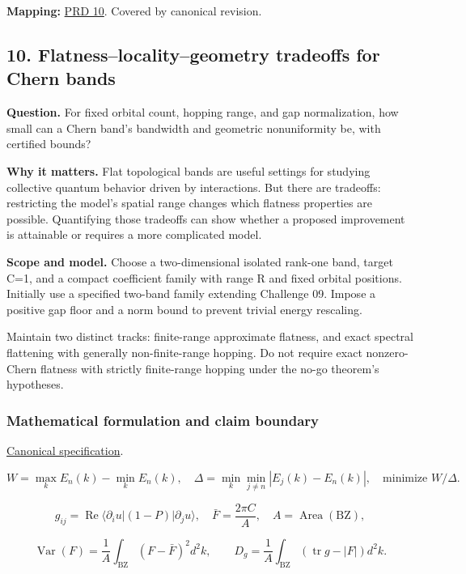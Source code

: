 \documentclass[
  11pt,
]{article}
\begin{document}
\textbf{Mapping:}
\href{https://github.com/rick-stevens-ai/Pure-Thought/blob/main/PRDs/10-Flat-Chern-Bands.md}{PRD
10}. Covered by canonical revision.

\subsection{10. Flatness--locality--geometry tradeoffs for Chern bands}

\textbf{Question.} For fixed orbital count, hopping range, and gap
normalization, how small can a Chern band's bandwidth and geometric
nonuniformity be, with certified bounds?

\textbf{Why it matters.} Flat topological bands are useful settings for
studying collective quantum behavior driven by interactions. But there
are tradeoffs: restricting the model's spatial range changes which
flatness properties are possible. Quantifying those tradeoffs can show
whether a proposed improvement is attainable or requires a more
complicated model.

\textbf{Scope and model.} Choose a two-dimensional isolated rank-one
band, target C=1, and a compact coefficient family with range R and
fixed orbital positions. Initially use a specified two-band family
extending Challenge 09. Impose a positive gap floor and a norm bound to
prevent trivial energy rescaling.

Maintain two distinct tracks: finite-range approximate flatness, and
exact spectral flattening with generally non-finite-range hopping. Do
not require exact nonzero-Chern flatness with strictly finite-range
hopping under the no-go theorem's hypotheses.

\subsubsection{Mathematical formulation and claim boundary}

\href{https://github.com/rick-stevens-ai/Pure-Thought/blob/main/PRDs/10-Flat-Chern-Bands.md}{Canonical
specification}.

\[W=\max_k E_n(k)-\min_k E_n(k),\quad
\Delta=\min_k\min_{j\ne n}|E_j(k)-E_n(k)|,\quad\text{minimize }W/\Delta.\]

\[g_{ij}=\operatorname{Re}\langle\partial_i u|(1-P)|\partial_j u\rangle,
\quad \bar F=\frac{2\pi C}{A},\quad A=\operatorname{Area}(\mathrm{BZ}),\]

\[\operatorname{Var}(F)=\frac1A\int_{\mathrm{BZ}}(F-\bar F)^2d^2k,
\qquad D_g=\frac1A\int_{\mathrm{BZ}}(\operatorname{tr}g-|F|)d^2k.\]
\end{document}
